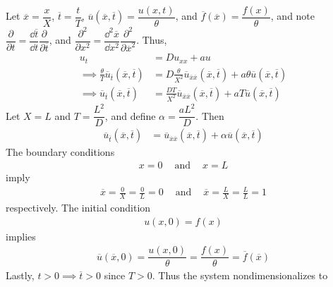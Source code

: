 \documentclass[fontsize=11pt]{article} %
\theoremstyle{plain}
\numberwithin{equation}{section} %
\numberwithin{figure}{section} %
\numberwithin{table}{section} %
\begin{document}
\begin{enumerate}[\bf (a)]
        Let $\overline{x} = \dfrac{x}{X}$, $\overline{t} = \dfrac{t}{T}$, $\overline{u}(\overline{x}, \overline{t}) = \dfrac{u(x,t)}{\theta}$, and $\overline{f}(\overline{x}) = \dfrac{f(x)}{\theta}$, and note $\dfrac{\partial}{\partial t} = \dfrac{\dd \overline{t}}{\dd t} \dfrac{\partial}{\partial\overline{t}}$, and $\dfrac{\partial^2}{\partial x^2} = \dfrac{\dd^2 \overline{x}}{\dd x^2} \dfrac{\partial^2}{\partial\overline{x}^2}$.  Thus,
        \begin{align*}
            u_t &= Du_{xx} + au \\
            \implies \frac{\theta}{T}\overline{u}_{\overline{t}}(\overline{x}, \overline{t}) &= D\frac{\theta}{X^2}\overline{u}_{\overline{x}\overline{x}}(\overline{x}, \overline{t}) + a\theta\overline{u}(\overline{x}, \overline{t}) \\
            \implies \overline{u}_{\overline{t}}(\overline{x}, \overline{t}) &= \frac{DT}{X^2}\overline{u}_{\overline{x}\overline{x}}(\overline{x}, \overline{t}) + aT\overline{u}(\overline{x}, \overline{t})
        \end{align*}
        Let $X = L$ and $T = \dfrac{L^2}{D}$, and define $\alpha = \dfrac{aL^2}{D}$.  Then
        \begin{align*}
            \overline{u}_{\overline{t}}(\overline{x}, \overline{t}) &= \overline{u}_{\overline{x}\overline{x}}(\overline{x}, \overline{t}) + \alpha\overline{u}(\overline{x}, \overline{t})
        \end{align*}
        The boundary conditions
        \begin{align*}
            x = 0\ \ \ \ \text{ and }\ \ \ \ x = L
        \end{align*} imply
        \begin{align*}
            \overline{x} = \frac{0}{X} = \frac{0}{L} = 0\ \ \ \ \text{ and }\ \ \ \ \overline{x} = \frac{L}{X} = \frac{L}{L} = 1
        \end{align*}
        respectively.  The initial condition
        \begin{align*}
            u(x,0) = f(x)
        \end{align*}
        implies
        \begin{align*}
            \overline{u}(\overline{x}, 0) = \dfrac{u(x,0)}{\theta} = \dfrac{f(x)}{\theta} = \overline{f}(\overline{x})
        \end{align*}
        Lastly, $t > 0 \implies \overline{t} > 0$ since $T > 0$.  Thus the system nondimensionalizes to
        \begin{align*}

\end{align*}
\end{enumerate}
\end{document}
